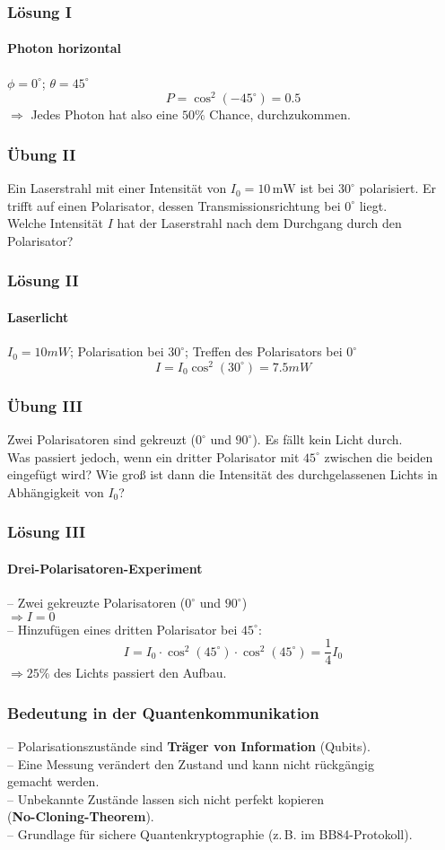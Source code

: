 \begin{frame}
	\frametitle{L{\"o}sung I}
	\framesubtitle{Photon horizontal}
	$\phi = 0^\circ$; $\theta = 45^\circ$
	\[
		\mathit{P} = \cos^2(-45^\circ) = 0.5
	\]
	$\Rightarrow$ Jedes Photon hat also eine $50\%$ Chance, durchzukommen.
\end{frame}

\begin{frame}
	\frametitle{{\"U}bung II}
	Ein Laserstrahl mit einer Intensität von $I_0 = 10 \,\text{mW}$ ist bei $30^\circ$ polarisiert. Er trifft auf einen Polarisator, dessen Transmissionsrichtung bei $0^\circ$ liegt.\\
	Welche Intensität $I$ hat der Laserstrahl nach dem Durchgang durch den Polarisator?
\end{frame}

\begin{frame}
	\frametitle{L{\"o}sung II}
	\framesubtitle{Laserlicht}
	$I_0 = 10 mW$; Polarisation bei $30^\circ$; Treffen des Polarisators bei $0^\circ$
	\[
		I = I_0 \cos^2(30^\circ) = 7.5 mW
	\]
\end{frame}

\begin{frame}
	\frametitle{{\"U}bung III}
	Zwei Polarisatoren sind gekreuzt ($0^\circ$ und $90^\circ$). 
	Es fällt kein Licht durch. \\
	Was passiert jedoch, wenn ein dritter Polarisator mit $45^\circ$ zwischen die beiden eingefügt wird? 
	Wie groß ist dann die Intensität des durchgelassenen Lichts in Abhängigkeit von $I_0$?
\end{frame}


\begin{frame}
	\frametitle{L{\"o}sung III}
	\framesubtitle{Drei-Polarisatoren-Experiment}
	 -- Zwei gekreuzte Polarisatoren ($0^\circ$ und $90^\circ$)\\
	 \hspace{0.5em} $\Rightarrow I = 0$ \\
	 -- Hinzufügen eines dritten Polarisator bei $45^\circ$:\\
	 \[
	 	I = I_0 \cdot \cos^2(45^\circ) \cdot \cos^2(45^\circ) = \frac{1}{4}I_0 
	 \]
	 $\Rightarrow 25\%$ des Lichts passiert den Aufbau.
\end{frame}

\begin{frame}
	\frametitle{Bedeutung in der Quantenkommunikation}
	--  Polarisationszustände sind \textbf{Träger von Information} (Qubits).\\
	--  Eine Messung verändert den Zustand und kann nicht rückgängig\\
		\hspace{0.5em} gemacht werden.\\
	-- Unbekannte Zustände lassen sich nicht perfekt kopieren \\
		\hspace{0.5em} (\textbf{No-Cloning-Theorem}).\\
	-- Grundlage für sichere Quantenkryptographie (z.\,B. im BB84-Protokoll).
\end{frame}